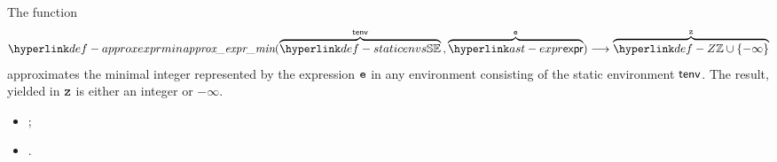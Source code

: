 \begin{mathpar}
\end{mathpar}

\begin{mathpar}
\end{mathpar}

\hypertarget{def-approxexprmin}{}
The function
\[
\approxexprmin(\overname{\staticenvs}{\tenv} \aslsep \overname{\expr}{\ve}) \aslto
  \overname{\Z \cup \{-\infty\}}{\vz}
\]
approximates the minimal integer represented by the expression $\ve$
in any environment consisting of the static environment
$\tenv$. The result, yielded in $\vz$ is either an integer or $-\infty$.

\ProseParagraph
\AllApply
\begin{itemize}
  \item \Proseapproxexpr{$\tenv$}{$\Over$}{$\ve$}{$\vs$};
  \item {}.
\end{itemize}

